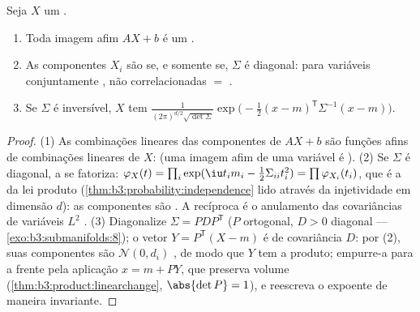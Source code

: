 \begin{theorem}\label{thm:b3:clt:gaussianvector}
Seja $X$ um .
\begin{enumerate}
  \item Toda imagem afim $AX + b$ é um .
  \item As componentes $X_i$ são \emph{} se, e somente
        se, $\Sigma$ é diagonal: para variáveis conjuntamente
        , não correlacionadas $=$ .
  \item Se $\Sigma$ é inversível, $X$ tem  $\frac{1}{(2\pi)^{d/2}\sqrt{\det\Sigma}}
        \exp\bigl(-\frac12(x - m)^{\mathsf T}\Sigma^{-1}(x -
        m)\bigr)$.
\end{enumerate}
\end{theorem}

\begin{proof}
(1) As combinações lineares das componentes de $AX + b$ são funções
afins de combinações lineares de $X$:  (uma imagem afim de
uma variável  é ).
(2) Se $\Sigma$ é diagonal, a  se fatoriza:
$\varphi_X(t) = \prod_i\exp(\iu t_im_i -
\frac12\Sigma_{ii}t_i^2) = \prod\varphi_{X_i}(t_i)$, que é a  da lei produto (\cref{thm:b3:probability:independence} lido
através da injetividade em dimensão $d$): as componentes são
. A recíproca é o anulamento das covariâncias de variáveis
$L^2$ .
(3) Diagonalize $\Sigma = P D P^{\mathsf T}$ ($P$ ortogonal, $D > 0$ diagonal ---
\cref{exo:b3:submanifolds:8}); o vetor $Y = P^{\mathsf T}(X - m)$ é  de covariância $D$: por
(2), suas componentes são $\mathcal N(0, d_i)$ , de modo que $Y$ tem a
 produto; empurre-a para a frente pela aplicação $x = m + PY$, que
preserva volume (\cref{thm:b3:product:linearchange}, $\abs{\det P} = 1$), e reescreva o expoente de
maneira invariante.
\end{proof}

